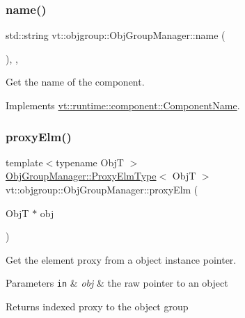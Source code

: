 \subsubsection{\texorpdfstring{name()}{name()}}
{\footnotesize\ttfamily std\+::string vt\+::objgroup\+::\+Obj\+Group\+Manager\+::name (\begin{DoxyParamCaption}{ }\end{DoxyParamCaption})\hspace{0.3cm}{\ttfamily [inline]}, {\ttfamily [override]}, {\ttfamily [virtual]}}



Get the name of the component. 



Implements \hyperlink{structvt_1_1runtime_1_1component_1_1_component_name_a33c06229bb605a2b2ceff68830d6d773}{vt\+::runtime\+::component\+::\+Component\+Name}.

\mbox{\label{structvt_1_1objgroup_1_1_obj_group_manager_a31f00bd509986001e3154af24239f24d}} 
\subsubsection{\texorpdfstring{proxy\+Elm()}{proxyElm()}}
{\footnotesize\ttfamily template$<$typename ObjT $>$ \\
\hyperlink{structvt_1_1objgroup_1_1_obj_group_manager_adba6c8ecb0f4c30e719f1abb995cfc9b}{Obj\+Group\+Manager\+::\+Proxy\+Elm\+Type}$<$ ObjT $>$ vt\+::objgroup\+::\+Obj\+Group\+Manager\+::proxy\+Elm (\begin{DoxyParamCaption}\item[{ObjT $\ast$}]{obj }\end{DoxyParamCaption})}



Get the element proxy from a object instance pointer. 


\begin{DoxyParams}[1]{Parameters}
\mbox{\tt in}  & {\em obj} & the raw pointer to an object\\
\hline
\end{DoxyParams}
\begin{DoxyReturn}{Returns}
indexed proxy to the object group 
\end{DoxyReturn}
\mbox{\label{structvt_1_1objgroup_1_1_obj_group_manager_a2aac72728c665b10dc7df994b3e326bc}} 

